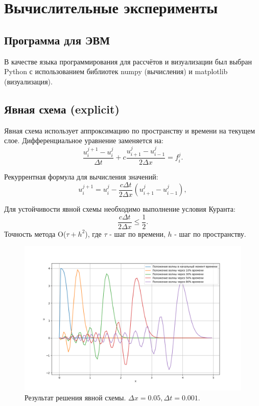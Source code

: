 \chapter{Вычислительные эксперименты}
\section{Программа для ЭВМ}
В качестве языка программирования для рассчётов и
визуализации был выбран Python с использованием библиотек numpy
(вычисления) и matplotlib (визуализация).
\section{Явная схема (explicit)}



Явная схема использует аппроксимацию по пространству и времени на текущем слое. Дифференциальное уравнение заменяется на:
$$
	\frac{u_i^{j+1} - u_i^j}{\Delta t} + c \frac{u_{i+1}^j - u_{i-1}^j}{2\Delta x} = f_{i}^{j}.
$$

Рекуррентная формула для вычисления значений:
$$
 u_i^{j+1} = u_i^j - \frac{c \Delta t}{2 \Delta x} \left( u_{i+1}^j - u_{i-1}^j \right),
$$

Для устойчивости явной схемы необходимо выполнение условия Куранта\cite{Turchak2003}:
\begin{equation}
	\boxed{\frac{c \Delta t}{2\Delta x} \leq \frac{1}{2}}.
	\label{eq:ust1}
\end{equation}
Точность метода O($\tau + h^2$), где $\tau$ - шаг по времени, $h$ - шаг по пространству.
\begin{figure}[h]  %
	\centering
	\includegraphics[height=0.7\textwidth]{imgs/explicit.png}  %
	\caption{Результат решения явной схемы. $\Delta x = 0.05, \Delta t = 0.001$.}  %
	\label{fig:explicit}  %
\end{figure}
\newline
 


